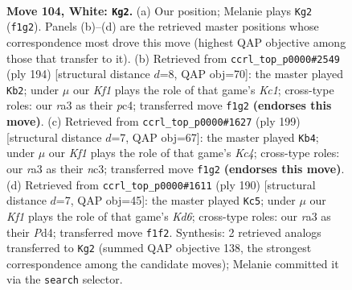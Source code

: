 \documentclass[11pt]{article}
\begin{document}
\clearpage

\begin{figure}[p]\centering
\begin{subfigure}{0.46\textwidth}\centering
\resizebox{\linewidth}{!}{%
\newchessgame
\chessboard[
  setfen={5R2/8/4k3/8/8/r7/8/5K1r w - - 18 104},
  showmover=false,
  pgfstyle=straightmove, color=movearrow, markmove={f1-g2}
]}
\caption{}
\end{subfigure}\hfill
\begin{subfigure}{0.46\textwidth}\centering
\resizebox{\linewidth}{!}{%
\newchessgame
\chessboard[
  setfen={8/3P4/8/2k5/2p5/8/8/r1K3R1 w - - 14 98},
  showmover=false,
  pgfstyle=straightmove, color=movearrow, markmove={c1-b2}
]}
\caption{}
\end{subfigure}
\\[4pt]
\begin{subfigure}{0.46\textwidth}\centering
\resizebox{\linewidth}{!}{%
\newchessgame
\chessboard[
  setfen={8/8/5K2/R1k5/8/2N5/6r1/8 b - - 4 100},
  showmover=false,
  pgfstyle=straightmove, color=movearrow, markmove={c5-b4}
]}
\caption{}
\end{subfigure}\hfill
\begin{subfigure}{0.46\textwidth}\centering
\resizebox{\linewidth}{!}{%
\newchessgame
\chessboard[
  setfen={3k4/7R/3K2r1/8/3P4/8/8/8 w - - 19 96},
  showmover=false,
  pgfstyle=straightmove, color=movearrow, markmove={d6-c5}
]}
\caption{}
\end{subfigure}
\caption{\textbf{Move 104, White: \texttt{Kg2}.} (a) Our position; Melanie plays \texttt{Kg2} (\texttt{f1g2}). Panels (b)--(d) are the retrieved master positions whose correspondence most drove this move (highest QAP objective among those that transfer to it). (b) Retrieved from \texttt{ccrl\_top\_p0000\#2549} (ply 194) [structural distance $d$=8, QAP obj=70]: the master played \texttt{Kb2}; under $\mu$ our \emph{Kf1} plays the role of that game's \emph{Kc1}; cross-type roles: our \emph{r}a3 as their \emph{p}c4; transferred move \texttt{f1g2} \textbf{(endorses this move)}. (c) Retrieved from \texttt{ccrl\_top\_p0000\#1627} (ply 199) [structural distance $d$=7, QAP obj=67]: the master played \texttt{Kb4}; under $\mu$ our \emph{Kf1} plays the role of that game's \emph{Kc4}; cross-type roles: our \emph{r}a3 as their \emph{n}c3; transferred move \texttt{f1g2} \textbf{(endorses this move)}. (d) Retrieved from \texttt{ccrl\_top\_p0000\#1611} (ply 190) [structural distance $d$=7, QAP obj=45]: the master played \texttt{Kc5}; under $\mu$ our \emph{Kf1} plays the role of that game's \emph{Kd6}; cross-type roles: our \emph{r}a3 as their \emph{P}d4; transferred move \texttt{f1f2}. Synthesis: 2 retrieved analogs transferred to \texttt{Kg2} (summed QAP objective 138, the strongest correspondence among the candidate moves); Melanie committed it via the \texttt{search} selector.}
\label{fig:thought-m206}
\end{figure}
\end{document}
